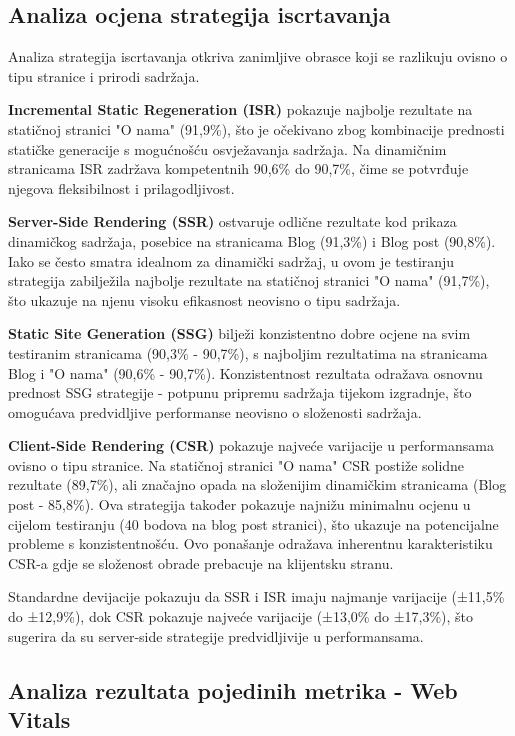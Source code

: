 \subsection{Analiza ocjena strategija iscrtavanja}

Analiza strategija iscrtavanja otkriva zanimljive obrasce koji se razlikuju ovisno o tipu stranice i prirodi sadržaja.

\textbf{Incremental Static Regeneration (ISR)} pokazuje najbolje rezultate na statičnoj stranici "O nama" (91,9\%), što je očekivano zbog kombinacije prednosti statičke generacije s mogućnošću osvježavanja sadržaja. Na dinamičnim stranicama ISR zadržava kompetentnih 90,6\% do 90,7\%, čime se potvrđuje njegova fleksibilnost i prilagodljivost.

\textbf{Server-Side Rendering (SSR)} ostvaruje odlične rezultate kod prikaza dinamičkog sadržaja, posebice na stranicama Blog (91,3\%) i Blog post (90,8\%). Iako se često smatra idealnom za dinamički sadržaj, u ovom je testiranju strategija zabilježila najbolje rezultate na statičnoj stranici "O nama" (91,7\%), što ukazuje na njenu visoku efikasnost neovisno o tipu sadržaja.

\textbf{Static Site Generation (SSG)} bilježi konzistentno dobre ocjene na svim testiranim stranicama (90,3\% - 90,7\%), s najboljim rezultatima na stranicama Blog i "O nama" (90,6\% - 90,7\%). Konzistentnost rezultata odražava osnovnu prednost SSG strategije - potpunu pripremu sadržaja tijekom izgradnje, što omogućava predvidljive performanse neovisno o složenosti sadržaja.

\textbf{Client-Side Rendering (CSR)} pokazuje najveće varijacije u performansama ovisno o tipu stranice. Na statičnoj stranici "O nama" CSR postiže solidne rezultate (89,7\%), ali značajno opada na složenijim dinamičkim stranicama (Blog post - 85,8\%). Ova strategija također pokazuje najnižu minimalnu ocjenu u cijelom testiranju (40 bodova na blog post stranici), što ukazuje na potencijalne probleme s konzistentnošću. Ovo ponašanje odražava inherentnu karakteristiku CSR-a gdje se složenost obrade prebacuje na klijentsku stranu.

Standardne devijacije pokazuju da SSR i ISR imaju najmanje varijacije (±11,5\% do ±12,9\%), dok CSR pokazuje najveće varijacije (±13,0\% do ±17,3\%), što sugerira da su server-side strategije predvidljivije u performansama.

\subsection{Analiza rezultata pojedinih metrika - Web Vitals}

